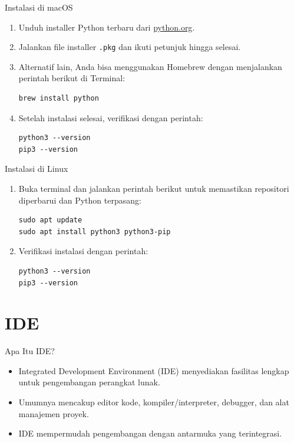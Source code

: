 \documentclass[aspectratio=169, table]{beamer}
\begin{document}
\begin{frame}[fragile]{Instalasi di macOS}
\begin{enumerate}
\item Unduh installer Python terbaru dari \href{https://www.python.org/downloads/macos/}{python.org}.
\item Jalankan file installer \texttt{.pkg} dan ikuti petunjuk hingga selesai.
\item Alternatif lain, Anda bisa menggunakan Homebrew dengan menjalankan perintah berikut di Terminal:
\begin{verbatim}
brew install python
\end{verbatim}
\item Setelah instalasi selesai, verifikasi dengan perintah:
\begin{verbatim}
python3 --version
pip3 --version
\end{verbatim}
\end{enumerate}
\end{frame}

\begin{frame}[fragile]{Instalasi di Linux}
\begin{enumerate}
\item Buka terminal dan jalankan perintah berikut untuk memastikan repositori diperbarui dan Python terpasang:
\begin{verbatim}
sudo apt update
sudo apt install python3 python3-pip
\end{verbatim}
\item Verifikasi instalasi dengan perintah:
\begin{verbatim}
python3 --version
pip3 --version
\end{verbatim}
\end{enumerate}
\end{frame}

\section{IDE}
\begin{frame}[fragile]{Apa Itu IDE?}
\begin{itemize}
\item Integrated Development Environment (IDE) menyediakan fasilitas lengkap untuk pengembangan perangkat lunak.
\item Umumnya mencakup editor kode, kompiler/interpreter, debugger, dan alat manajemen proyek.
\item IDE mempermudah pengembangan dengan antarmuka yang terintegrasi.
\end{itemize}
\end{frame}
\end{document}
